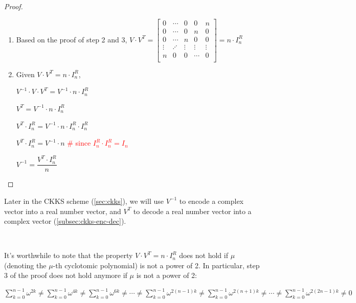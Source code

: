 \begin{proof}
\begin{enumerate}
Therefore,

$\sum\limits_{k=0}^{n-1} \omega^{2k} = \sum\limits_{k=0}^{n-1} \omega^{4k} = \sum\limits_{k=0}^{n-1} \omega^{6k} = \cdots = \sum\limits_{k=0}^{n-1} \omega^{2(n-1)k} = \sum\limits_{k=0}^{n-1} \omega^{2(n+1)k} = \cdots = \sum\limits_{k=0}^{n-1} \omega^{2(2n-1)k} = 0$

$ $

\item Based on the proof of step 2 and 3, $V \cdot V^T = 
\begin{bmatrix}
0 & \cdots & 0 & 0 & n\\
0 & \cdots & 0 & n & 0\\
0 & \cdots & n & 0 & 0\\
\vdots & \iddots & \vdots & \vdots & \vdots \\
n & 0 & 0 & \cdots & 0\\
\end{bmatrix} = n \cdot I_n^R$

\item Given $V \cdot V^T = n \cdot I_n^R$, 

$V^{-1} \cdot V \cdot V^T = V^{-1} \cdot n \cdot I_n^R$

$V^T = V^{-1} \cdot n \cdot I_n^R$

$V^T \cdot I_n^R = V^{-1} \cdot n \cdot I_n^R  \cdot I_n^R$

$V^T \cdot I_n^R = V^{-1} \cdot n$ \textcolor{red}{\text{ } \# since $I_n^R  \cdot I_n^R = I_n$}

$V^{-1} = \dfrac{V^T \cdot I_n^R}{n}$

\end{enumerate}
\end{proof}

Later in the CKKS scheme (\autoref{sec:ckks}), we will use $V^{-1}$ to encode a complex vector into a real number vector, and $V^T$ to decode a real number vector into a complex vector (\autoref{subsec:ckks-enc-dec}).

$ $

 It's worthwhile to note that the property $V\cdot V^T = n\cdot I_n^R$ does not hold if $\mu$ (denoting the $\mu$-th cyclotomic polynomial) is not a power of 2. In particular, step 3 of the proof does not hold anymore if $\mu$ is not a power of 2:

$\sum\limits_{k=0}^{n-1} \omega^{2k} \neq \sum\limits_{k=0}^{n-1} \omega^{4k} \neq \sum\limits_{k=0}^{n-1} \omega^{6k} \neq \cdots \neq \sum\limits_{k=0}^{n-1} \omega^{2(n-1)k} \neq \sum\limits_{k=0}^{n-1} \omega^{2(n+1)k} \neq \cdots \neq \sum\limits_{k=0}^{n-1} \omega^{2(2n-1)k} \neq 0$



